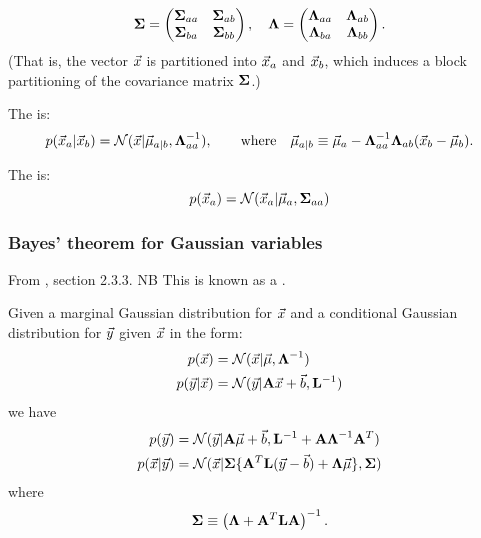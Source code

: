 \documentclass[11pt]{article}
\begin{document}
\begin{appendices}
\begin{equation}
  \boldsymbol{\Sigma} =
  \left(
    \begin{matrix}
      \boldsymbol{\Sigma}_{aa} & \boldsymbol{\Sigma}_{ab} \\
      \boldsymbol{\Sigma}_{ba} & \boldsymbol{\Sigma}_{bb}
    \end{matrix}
  \right)
  , \quad
  \boldsymbol{\Lambda} =
  \left(
    \begin{matrix}
      \boldsymbol{\Lambda}_{aa} & \boldsymbol{\Lambda}_{ab} \\
      \boldsymbol{\Lambda}_{ba} & \boldsymbol{\Lambda}_{bb}
    \end{matrix}
  \right).
\end{equation}
(That is, the vector $\vec{x}$ is partitioned into $\vec{x}_a$ and $\vec{x}_b$, which
induces a block partitioning of the covariance matrix $\boldsymbol{\Sigma}$.)

The  is:
\begin{equation}
  \label{eq:gauss_part_cond}
  p(\vec{x}_a | \vec{x}_b) = \mathcal{N}(\vec{x} | \vec{\mu}_{a | b}, \boldsymbol{\Lambda}_{aa}^{-1}),
  \qquad  \textrm{where}\quad \vec{\mu}_{a | b} \equiv \vec{\mu}_a - \boldsymbol{\Lambda}_{aa}^{-1}
  \boldsymbol{\Lambda}_{ab} (\vec{x}_b - \vec{\mu}_b).
\end{equation}

The  is:
\begin{equation}
  \label{eq:gauss_part_marg}
  p(\vec{x}_a) = \mathcal{N}(\vec{x}_a | \vec{\mu}_a, \boldsymbol{\Sigma}_{aa})
\end{equation}

\subsubsection{Bayes' theorem for Gaussian variables}
From \cite{BISHOP}, section 2.3.3. NB This is known as a .

Given a marginal Gaussian distribution for $\vec{x}$ and a conditional Gaussian
distribution for $\vec{y}$ given $\vec{x}$ in the form:
\begin{align}
  p(\vec{x})       &= \mathcal{N}(\vec{x} | \vec{\mu}, \boldsymbol{\Lambda}^{-1})\\
  p(\vec{y}|\vec{x}) &= \mathcal{N}(\vec{y} | \mathbf{A} \vec{x} + \vec{b}, \mathbf{L}^{-1})
\end{align}
we have
\begin{align}
  \label{eq:gauss_bayes_marg}
  p(\vec{y})       &= \mathcal{N} (\vec{y} |\mathbf{A} \vec{\mu} + \vec{b}, \mathbf{L}^{-1} + \mathbf{A}
                   \boldsymbol{\Lambda}^{-1} \mathbf{A}^T )\\
  \label{eq:gauss_bayes_cond}
  p(\vec{x}|\vec{y}) &= \mathcal{N} ( \vec{x} | \boldsymbol{\Sigma} \{ \mathbf{A}^T \mathbf{L} (\vec{y} - \vec{b}) +
                   \boldsymbol{\Lambda} \vec{\mu} \}, \boldsymbol{\Sigma})
\end{align}
where
\begin{equation}
  \boldsymbol{\Sigma} \equiv \left(\boldsymbol{\Lambda} + \mathbf{A}^T \mathbf{L} \mathbf{A} \right)^{-1}.
\end{equation}



\end{appendices}
\end{document}
